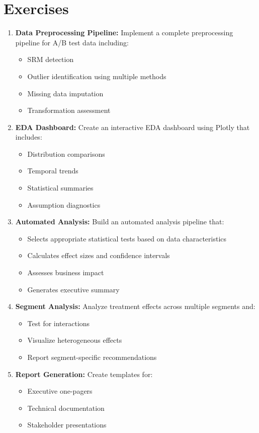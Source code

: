 \section{Exercises}

\begin{enumerate}
    \item \textbf{Data Preprocessing Pipeline:} Implement a complete preprocessing pipeline for A/B test data including:
    \begin{itemize}
        \item SRM detection
        \item Outlier identification using multiple methods
        \item Missing data imputation
        \item Transformation assessment
    \end{itemize}

    \item \textbf{EDA Dashboard:} Create an interactive EDA dashboard using Plotly that includes:
    \begin{itemize}
        \item Distribution comparisons
        \item Temporal trends
        \item Statistical summaries
        \item Assumption diagnostics
    \end{itemize}

    \item \textbf{Automated Analysis:} Build an automated analysis pipeline that:
    \begin{itemize}
        \item Selects appropriate statistical tests based on data characteristics
        \item Calculates effect sizes and confidence intervals
        \item Assesses business impact
        \item Generates executive summary
    \end{itemize}

    \item \textbf{Segment Analysis:} Analyze treatment effects across multiple segments and:
    \begin{itemize}
        \item Test for interactions
        \item Visualize heterogeneous effects
        \item Report segment-specific recommendations
    \end{itemize}

    \item \textbf{Report Generation:} Create templates for:
    \begin{itemize}
        \item Executive one-pagers
        \item Technical documentation
        \item Stakeholder presentations
    \end{itemize}
\end{enumerate}
